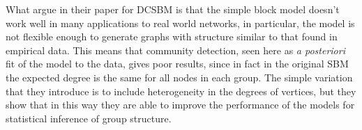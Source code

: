 What \textcite{karrer2011dcsbm} argue in their paper for DCSBM is that the simple block model doesn't work well in many applications to real world networks, in particular, the model is not flexible enough to generate graphs with structure similar to that found in empirical data. This means that community detection, seen here as \textit{a posteriori} fit of the model to the data, gives poor results, since in fact in the original SBM the expected degree is the same for all nodes in each group. The simple variation that they introduce is to include heterogeneity in the degrees of vertices, but they show that in this way they are able to improve the performance of the models for statistical inference of group structure.

